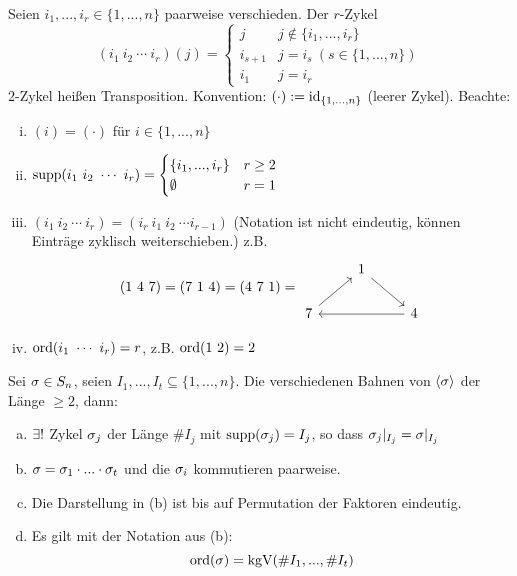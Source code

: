 \documentclass[a4paper]{report}
\begin{document}
\begin{defi}
  Seien $i_{1}, ..., i_{r} \in \{1, ..., n\}$ paarweise verschieden. Der $r$-Zykel \[(i_{1} \ i_{2}\ \cdots \ i_{r})(j) =
  \begin{cases}
    j & j \notin \{i_{1}, ..., i_{r}\} \\
    i_{s+1} & j = i_{s} \ (s \in \{1, ..., n\}) \\
    i_{1} & j = i_{r}
  \end{cases}\]
$2$-Zykel heißen Transposition.
Konvention: $( \cdot ):= \operatorname{id}_{\{1, ..., n\}}$ (leerer Zykel).
Beachte:
\begin{enumerate}[(i)]
  \item $(i) = (\cdot)$ für $i \in \{1, ..., n\}$
  \item $\operatorname{supp}(i_{1} \ i_{2} \ \cdots \ i_{r}) =
        \begin{cases}
          \{i_{1}, ..., i_{r}\} & r \ge 2 \\
          \emptyset & r =1
        \end{cases}$
  \item $(i_{1} \ i_{2}\ \cdots \ i_{r}) = (i_{r} \ i_{1} \ i_{2} \ \cdots i_{r-1})$ (Notation ist nicht eindeutig, können Einträge zyklisch weiterschieben.)
        z.B.
        \[(1 \ 4\ 7) = (7\ 1\ 4) = (4\ 7\ 1)
= \begin{tikzcd}
             & 1 \arrow[rd] &              \\
7 \arrow[ru] &              & 4 \arrow[ll]
\end{tikzcd}
        \]
  \item $\operatorname{ord}(i_{1}\ \cdots \ i_{r}) = r$, z.B. $\operatorname{ord}(1 \ 2) = 2$
\end{enumerate}
\end{defi}

\begin{satz}[Zykeldarstellung]
  Sei $\sigma \in S_n$, seien $I_{1}, ..., I_{t} \subseteq \{1, ..., n\}$. Die verschiedenen Bahnen von $\langle \sigma \rangle$ der Länge $\ge 2$, dann:
  \begin{enumerate}[(a)]
    \item $\exists !$ Zykel $\sigma_{j}$ der Länge $\# I_{j}$ mit $\operatorname{supp}(\sigma_{j}) =I_{j}$, so dass $\sigma_{j}|_{I_{j}} = \sigma|_{I_{j}}$
    \item $\sigma = \sigma_{1} \cdot ... \cdot \sigma_{t}$ und die $\sigma_{i}$ kommutieren paarweise.
    \item Die Darstellung in (b) ist bis auf Permutation der Faktoren eindeutig.
    \item Es gilt mit der Notation aus (b):
          \[\operatorname{ord}(\sigma) = \operatorname{kgV}(\#I_{1}, ..., \# I_{t})\]
  \end{enumerate}

\end{satz}
\end{document}

